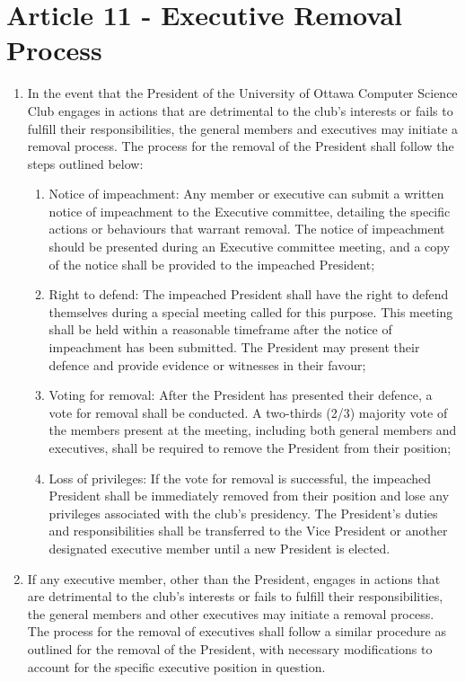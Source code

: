 \section*{Article 11 - Executive Removal Process}

\begin{enumerate}
    \item In the event that the President of the University of Ottawa Computer Science Club engages in actions that are detrimental to the club's interests or fails to fulfill their responsibilities, the general members and executives may initiate a removal process. The process for the removal of the President shall follow the steps outlined below:
    
    \begin{enumerate}
        \item Notice of impeachment: Any member or executive can submit a written notice of impeachment to the Executive committee, detailing the specific actions or behaviours that warrant removal. The notice of impeachment should be presented during an Executive committee meeting, and a copy of the notice shall be provided to the impeached President;
        
        \item Right to defend: The impeached President shall have the right to defend themselves during a special meeting called for this purpose. This meeting shall be held within a reasonable timeframe after the notice of impeachment has been submitted. The President may present their defence and provide evidence or witnesses in their favour;
        
        \item Voting for removal: After the President has presented their defence, a vote for removal shall be conducted. A two-thirds (2/3) majority vote of the members present at the meeting, including both general members and executives, shall be required to remove the President from their position;
        
        \item Loss of privileges: If the vote for removal is successful, the impeached President shall be immediately removed from their position and lose any privileges associated with the club's presidency. The President's duties and responsibilities shall be transferred to the Vice President or another designated executive member until a new President is elected.
    \end{enumerate}
    
    
    \item If any executive member, other than the President, engages in actions that are detrimental to the club's interests or fails to fulfill their responsibilities, the general members and other executives may initiate a removal process. The process for the removal of executives shall follow a similar procedure as outlined for the removal of the President, with necessary modifications to account for the specific executive position in question.
\end{enumerate}

